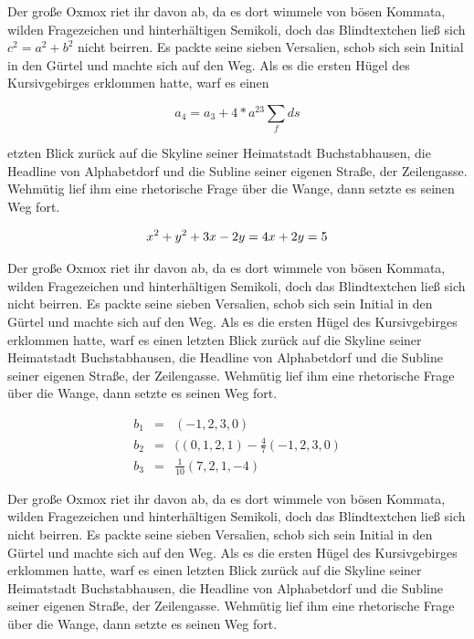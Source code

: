 \documentclass[%
	12pt,%
	a4paper,%
	oneside,%
	liststotoc, idxtotoc, bibtotoc, %
	parskip=half,%
	nochapterprefix,%
	appendixprefix, %
	headings=small,%
]{scrreprt}
\newcommand{\alt}[1]{}%
\begin{document}
Der große Oxmox riet ihr davon ab, da es dort wimmele von bösen Kommata, wilden Fragezeichen und hinterhältigen Semikoli, doch das Blindtextchen ließ sich \alt{c^2=a^2+b^2}\(c^{2}=a^{2}+b^{2}\) nicht beirren. Es packte seine sieben Versalien, schob sich sein Initial in den Gürtel und machte sich auf den Weg. Als es die ersten Hügel des Kursivgebirges erklommen hatte, warf es einen 

\[\alt{c_4 = a_3 + 4...}a_4 = a_3 + 4 * a^23 \sum_f ds\]

etzten Blick zurück auf die Skyline seiner Heimatstadt Buchstabhausen, die Headline von Alphabetdorf und die Subline seiner eigenen Straße, der Zeilengasse. Wehmütig lief ihm eine rhetorische Frage über die Wange, dann setzte es seinen Weg fort.

\begin{equation}
\alt{x^2+y^2 + 3x =4}
x^2 + y^2 +3x -2y = 4 \\
x + 2y  = 5
\end{equation}

Der große Oxmox riet ihr davon ab, da es dort wimmele von bösen Kommata, wilden Fragezeichen und hinterhältigen Semikoli, doch das Blindtextchen ließ sich nicht beirren. Es packte seine sieben Versalien, schob sich sein Initial in den Gürtel und machte sich auf den Weg. Als es die ersten Hügel des Kursivgebirges erklommen hatte, warf es einen letzten Blick zurück auf die Skyline seiner Heimatstadt Buchstabhausen, die Headline von Alphabetdorf und die Subline seiner eigenen Straße, der Zeilengasse. Wehmütig lief ihm eine rhetorische Frage über die Wange, dann setzte es seinen Weg fort.

\begin{eqnarray}
\alt{b_1 = -1,2,3,0}
b_1 & = & (-1,2,3,0) \\
b_2 & = & ((0,1,2,1)-\frac{4}{7}(-1,2,3,0) \\
b_3 & = & \frac{1}{10}(7,2,1,-4)
\end{eqnarray}

Der große Oxmox riet ihr davon ab, da es dort wimmele von bösen Kommata, wilden Fragezeichen und hinterhältigen Semikoli, doch das Blindtextchen ließ sich nicht beirren. Es packte seine sieben Versalien, schob sich sein Initial in den Gürtel und machte sich auf den Weg. Als es die ersten Hügel des Kursivgebirges erklommen hatte, warf es einen letzten Blick zurück auf die Skyline seiner Heimatstadt Buchstabhausen, die Headline von Alphabetdorf und die Subline seiner eigenen Straße, der Zeilengasse. Wehmütig lief ihm eine rhetorische Frage über die Wange, dann setzte es seinen Weg fort.
\end{document}
